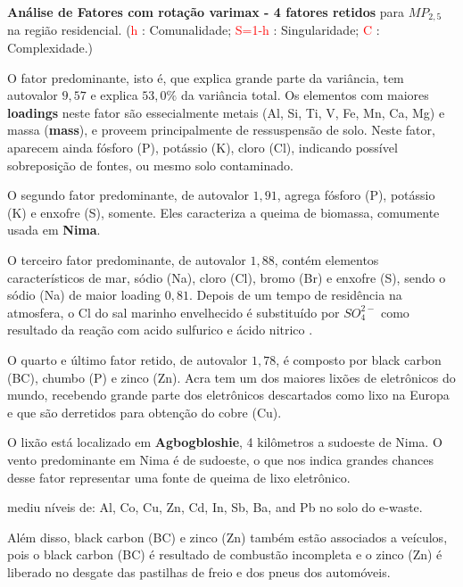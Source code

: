 \begin{table}[H]
  \caption{\textbf{Análise de Fatores com rotação varimax - 4 fatores retidos} 
             para $MP_{2,5}$ na região residencial.
           (\textcolor{red}{h} : Comunalidade; 
           \textcolor{red}{S=1-h} : Singularidade; 
           \textcolor{red}{C} : Complexidade.)}
  
\end{table}

O fator predominante, isto é, que explica grande parte da variância, 
tem autovalor $9,57$ e explica $53,0\%$ da variância total.
Os elementos com maiores \textbf{loadings} neste fator são essecialmente 
metais (Al, Si, Ti, V, Fe, Mn, Ca, Mg) e massa (\textbf{mass}), e proveem 
principalmente de ressuspensão de solo.
Neste fator, aparecem ainda fósforo (P), potássio (K), cloro (Cl), indicando 
possível sobreposição de fontes, ou mesmo solo contaminado.

O segundo fator predominante, de autovalor $1,91$, agrega fósforo (P), 
potássio (K) e enxofre (S), somente. Eles caracteriza a queima de biomassa, 
comumente usada em \textbf{Nima}.

O terceiro fator predominante, de autovalor $1,88$, contém elementos
característicos de mar, sódio (Na), cloro (Cl), bromo (Br) e enxofre (S), 
sendo o sódio (Na) de maior loading $0,81$. 
Depois de um tempo de residência na atmosfera, o Cl do sal marinho envelhecido 
é substituído por $SO_4^{2-}$ como resultado da reação com acido sulfurico e 
ácido nitrico \citep{mcinnes1994}. 


O quarto e último fator retido, de autovalor $1,78$, é composto 
por black carbon (BC), chumbo (P) e zinco (Zn). 
Acra tem um dos maiores lixões de eletrônicos do mundo, recebendo
grande parte dos eletrônicos descartados como lixo na Europa e que são derretidos
para obtenção do cobre (Cu). 

O lixão está localizado em \textbf{Agbogbloshie}, 4 kilômetros a sudoeste de Nima. 
O vento predominante em Nima é de sudoeste, o que nos indica grandes chances 
desse fator representar uma fonte de queima de lixo eletrônico.

\citep{asante2012} mediu níveis de:
Al, Co, Cu, Zn, Cd, In, Sb, Ba, and Pb no solo do e-waste.

Além disso, black carbon (BC) e zinco (Zn) também estão associados a veículos, 
pois o black carbon (BC) é resultado de combustão incompleta e o zinco (Zn) é
liberado no desgate das pastilhas de freio e dos pneus dos automóveis. 

